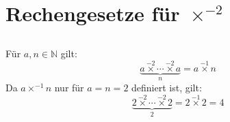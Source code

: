 \documentclass{article}
\begin{document}
\section{Rechengesetze f\"ur $\operatorname*{\times}^{-2}$\newline}

\subsection{}
F\"ur $a, n \in \mathbb{N}$ gilt:
\[ \underbrace{a \operatorname*{\times}^{-2} \dotsb \operatorname*{\times}^{-2} a}_n = a\operatorname*{\times}^{-1} n \]
Da $a\operatorname*{\times}^{-1}n$ nur f\"ur $a=n=2$ definiert ist, gilt:
\[ \underbrace{2 \operatorname*{\times}^{-2} \dotsb \operatorname*{\times}^{-2} 2}_2 = 2 \operatorname*{\times}^{-1} 2 = 4 \]
\end{document}
